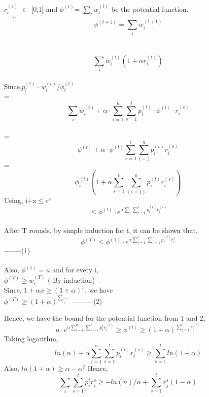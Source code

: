 $r_i^{(s)}$ $\in$ [0,1] and $\phi^{(t)}$= $\sum_{i}w_i^{(t)}$ be the potential function. \\
$\implies$ \\
$$\phi^{(t+1)}= \sum_{i}w_i^{(t+1)} $$\\
=$$\sum_{i} w_i^{(t)}(1+\alpha r_i^{(t)})$$ \\
Since,$ p_i^{(t)}$=$w_i^{(t)}$/$\phi_i^{(t)}$ \\
=$$\sum_{i}w_i^{(t)} + \alpha\cdot \sum_{i=1}^{n}\sum_{s=1}^{t}p_i^{(t)}\cdot\phi^{(t)}\cdot r_i^{(s)} $$\\
=$$\phi^{(t)}+ \alpha\cdot\phi^{(t)}\sum_{s=1}^{t}\sum_{i=1}^{n}p_i^{(t)}r_i^{(s)}$$
 =$$\phi_i^{(t)} (1 +\alpha\sum_{s=1}^{t}\sum_{(i=1)}^{n}p_i^{(t)}r_i^{(s)}) $$
Using, i+x$\leq e^x $
$$\leq \phi^{(t)}\cdot e^{\alpha\sum_{i}\sum_{s=1}^{t}p_i^{(t)}r_i^{(s)}}$$ \\

After T rounds, by simple induction for t, it can be shown that,
$$\phi^{(T)}\leq \phi^{(1)}\cdot e^{\alpha\sum_{s=1}^{t}\sum_{i=1}^{n}p_i^{(t)}r_i^{s}}$$--------(1) 
\\\\
Also, $\phi^{(1)}=n $ and for every i,  \\
$\phi^{(T)}\geq w_i^{(T)}$ ( By induction)  \\
Since, $ 1+\alpha x \geq (1 +\alpha)^{x} $, we have \\
$\phi^{(T)} \geq (1+\alpha)^{\sum_{r_i^{(s)}}} $  ---------(2)

Hence, we have the bound for the potential function from 1 and 2, \\
$$n\cdot e^{\alpha\sum_{i=1}^{n}\sum_{s=1}^{t}p_i^{t}r_i^{(s)}} \geq \phi^{(t)} \geq (1+\alpha)^{\sum_{s=1}^{t}r_i^{(s)}}$$
Taking logarithm, \\
$$ln(n) + \alpha\sum_{i=1}^{n}\sum_{s=1}^{t}p_i^{(t)}r_i^{(s)} \geq \sum_{s=1}^{t} ln(1+\alpha) $$
Also, $ ln(1+\alpha) \geq \alpha- \alpha^{2} $
Hence, \\

$$\sum_{i}\sum_{s=1}^{t}p_i^{t}r_i^{s} \geq -ln(n)/\alpha + \sum_{s=1}^{t}r_j^{s} (1-\alpha) $$